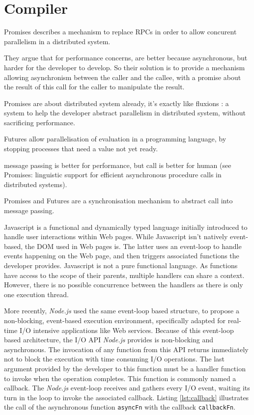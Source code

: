 \section{Compiler} \label{section:compiler}

Promises\cite{Liskov1988} describes a mechanism to replace RPCs in order to allow concurent parallelism in a distributed system.

They argue that for performance concerns, are better because asynchronous, but harder for the developer to develop.
So their solution is to provide a mechanism allowing asynchronism between the caller and the callee, with a promise about the result of this call for the caller to manipulate the result.

Promises are about distributed system already, it's exactly like fluxions : a system to help the developer abstract parallelism in distributed system, without sacrificing performance.

Futures allow parallelisation of evaluation in a programming language, by stopping processes that need a value not yet ready.

message passing is better for performance, but call is better for human (see Promises: linguistic support for efficient asynchronous procedure calls in distributed systems).

Promises and Futures are a synchronisation mechanism to abstract call into message passing.









Javascript is a functional and dynamically typed language initially introduced to handle user interactions within Web pages.
While Javascript isn't natively event-based, the DOM used in Web pages is.
The latter uses an event-loop to handle events happening on the Web page, and then triggers associated functions the developer provides.
Javascript is not a pure functional language.
As functions have access to the scope of their parents, multiple handlers can share a context.
However, there is no possible concurrence between the handlers as there is only one execution thread.

More recently, \textit{Node.js} used the same event-loop based structure, to propose a non-blocking, event-based execution environment, specifically adapted for real-time I/O intensive applications like Web services.
Because of this event-loop based architecture, the I/O API \textit{Node.js} provides is non-blocking and asynchronous.
The invocation of any function from this API returns immediately not to block the execution with time consuming I/O operations.
The last argument provided by the developer to this function must be a handler function to invoke when the operation completes.
This function is commonly named a callback.
The \textit{Node.js} event-loop receives and gathers every I/O event, waiting its turn in the loop to invoke the associated callback.
Listing \ref{lst:callback} illustrates the call of the asynchronous function \texttt{asyncFn} with the callback \texttt{callbackFn}.

